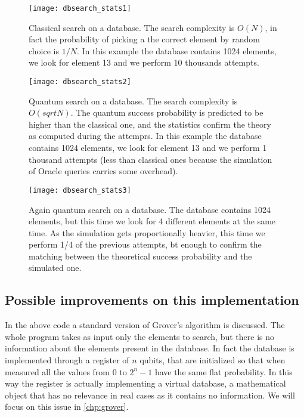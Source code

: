\begin{figure}
	\centering
	\texttt{[image: dbsearch\_stats1]}
	\caption{Classical search on a database. The search complexity is $O(N)$, in fact the probability of picking a the correct element by random choice is $1/N$. In this example the database contains 1024 elements, we look for element 13 and we perform 10 thousands attempts.}
	\label{fig:db_stats1}
\end{figure}

\begin{figure}
	\centering
	\texttt{[image: dbsearch\_stats2]}
		\caption{Quantum search on a database. The search complexity is $O(sqrt{N})$. The quantum success probability is predicted to be higher than the classical one, and the statistics confirm the theory as computed during the attemprs. In this example the database contains 1024 elements, we look for element 13 and we perform 1 thousand attempts (less than classical ones because the simulation of Oracle queries carries some overhead).}
	\label{fig:db_stats2}
\end{figure}

\begin{figure}
	\centering
	\texttt{[image: dbsearch\_stats3]}
	\caption{Again quantum search on a database. The database contains 1024 elements, but this time we look for 4 different elements at the same time. As the simulation gets proportionally heavier, this time we perform 1/4 of the previous attempts, bt enough to confirm the matching between the theoretical success probability and the simulated one.}
	\label{fig:db_stats3}
\end{figure}

\subsection{Possible improvements on this implementation}

In the above code a standard version of Grover's algorithm is discussed. The whole program takes as input only the elements to search, but there is no information about the elements present in the database. In fact the database is implemented through a register of $n$ qubits, that are initialized so that when measured all the values from $0$ to $2^n - 1$ have the same flat probability. In this way the register is actually implementing a virtual database, a mathematical object that has no relevance in real cases as it contains no information. We will focus on this issue in \cref{chp:grover}.
